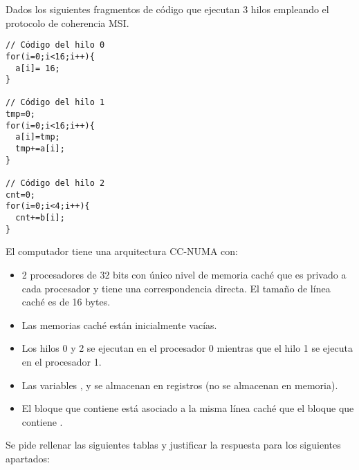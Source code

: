 \begin{acexercise}\end{acexercise}
\label{ex:m5-02:dir-01}

Dados los siguientes fragmentos de código que ejecutan 3 hilos empleando el
protocolo de coherencia MSI.

\begin{lstlisting}
// Código del hilo 0
for(i=0;i<16;i++){
  a[i]= 16;
}
 
// Código del hilo 1
tmp=0;
for(i=0;i<16;i++){
  a[i]=tmp;
  tmp+=a[i];
}
 
// Código del hilo 2
cnt=0;
for(i=0;i<4;i++){
  cnt+=b[i];
}
\end{lstlisting}

El computador tiene una arquitectura CC-NUMA con:

\begin{itemize}
  \item 2 procesadores de 32 bits con único nivel de memoria caché que 
        es privado a cada procesador y tiene una correspondencia directa. 
        El tamaño de línea caché es de 16 bytes. 
  \item Las memorias caché están inicialmente vacías.
  \item Los hilos 0 y 2 se ejecutan en el procesador 0 mientras que el hilo 1 
        se ejecuta en el procesador  1.
  \item Las variables ,  y  se almacenan en 
        registros (no se almacenan en memoria). 
  \item El bloque que contiene  está asociado a la misma línea 
        caché que el bloque que contiene .
\end{itemize}

Se pide rellenar las siguientes tablas y justificar la respuesta para los siguientes apartados:

